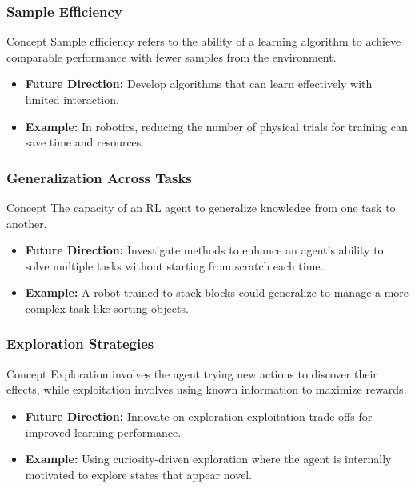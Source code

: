 \documentclass[aspectratio=169]{beamer}
\begin{document}
\begin{frame}
    \frametitle{Sample Efficiency}
    \begin{block}{Concept}
        Sample efficiency refers to the ability of a learning algorithm to achieve comparable performance with fewer samples from the environment.
    \end{block}
    \begin{itemize}
        \item \textbf{Future Direction:} Develop algorithms that can learn effectively with limited interaction.
        \item \textbf{Example:} In robotics, reducing the number of physical trials for training can save time and resources.
    \end{itemize}
\end{frame}

\begin{frame}
    \frametitle{Generalization Across Tasks}
    \begin{block}{Concept}
        The capacity of an RL agent to generalize knowledge from one task to another.
    \end{block}
    \begin{itemize}
        \item \textbf{Future Direction:} Investigate methods to enhance an agent’s ability to solve multiple tasks without starting from scratch each time.
        \item \textbf{Example:} A robot trained to stack blocks could generalize to manage a more complex task like sorting objects.
    \end{itemize}
\end{frame}

\begin{frame}
    \frametitle{Exploration Strategies}
    \begin{block}{Concept}
        Exploration involves the agent trying new actions to discover their effects, while exploitation involves using known information to maximize rewards.
    \end{block}
    \begin{itemize}
        \item \textbf{Future Direction:} Innovate on exploration-exploitation trade-offs for improved learning performance.
        \item \textbf{Example:} Using curiosity-driven exploration where the agent is internally motivated to explore states that appear novel.
    \end{itemize}
\end{frame}
\end{document}
